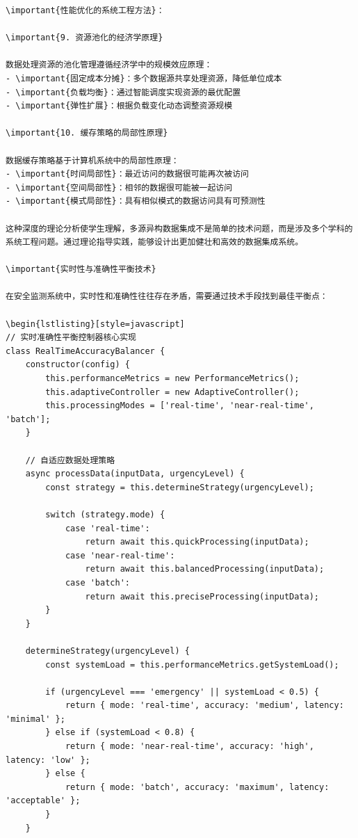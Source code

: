\begin{verbatim}
\important{性能优化的系统工程方法}：

\important{9. 资源池化的经济学原理}

数据处理资源的池化管理遵循经济学中的规模效应原理：
- \important{固定成本分摊}：多个数据源共享处理资源，降低单位成本
- \important{负载均衡}：通过智能调度实现资源的最优配置
- \important{弹性扩展}：根据负载变化动态调整资源规模

\important{10. 缓存策略的局部性原理}

数据缓存策略基于计算机系统中的局部性原理：
- \important{时间局部性}：最近访问的数据很可能再次被访问
- \important{空间局部性}：相邻的数据很可能被一起访问
- \important{模式局部性}：具有相似模式的数据访问具有可预测性

这种深度的理论分析使学生理解，多源异构数据集成不是简单的技术问题，而是涉及多个学科的系统工程问题。通过理论指导实践，能够设计出更加健壮和高效的数据集成系统。

\important{实时性与准确性平衡技术}

在安全监测系统中，实时性和准确性往往存在矛盾，需要通过技术手段找到最佳平衡点：

\begin{lstlisting}[style=javascript]
// 实时准确性平衡控制器核心实现
class RealTimeAccuracyBalancer {
    constructor(config) {
        this.performanceMetrics = new PerformanceMetrics();
        this.adaptiveController = new AdaptiveController();
        this.processingModes = ['real-time', 'near-real-time', 'batch'];
    }
    
    // 自适应数据处理策略
    async processData(inputData, urgencyLevel) {
        const strategy = this.determineStrategy(urgencyLevel);
        
        switch (strategy.mode) {
            case 'real-time':
                return await this.quickProcessing(inputData);
            case 'near-real-time':
                return await this.balancedProcessing(inputData);
            case 'batch':
                return await this.preciseProcessing(inputData);
        }
    }
    
    determineStrategy(urgencyLevel) {
        const systemLoad = this.performanceMetrics.getSystemLoad();
        
        if (urgencyLevel === 'emergency' || systemLoad < 0.5) {
            return { mode: 'real-time', accuracy: 'medium', latency: 'minimal' };
        } else if (systemLoad < 0.8) {
            return { mode: 'near-real-time', accuracy: 'high', latency: 'low' };
        } else {
            return { mode: 'batch', accuracy: 'maximum', latency: 'acceptable' };
        }
    }
    

\end{verbatim}
